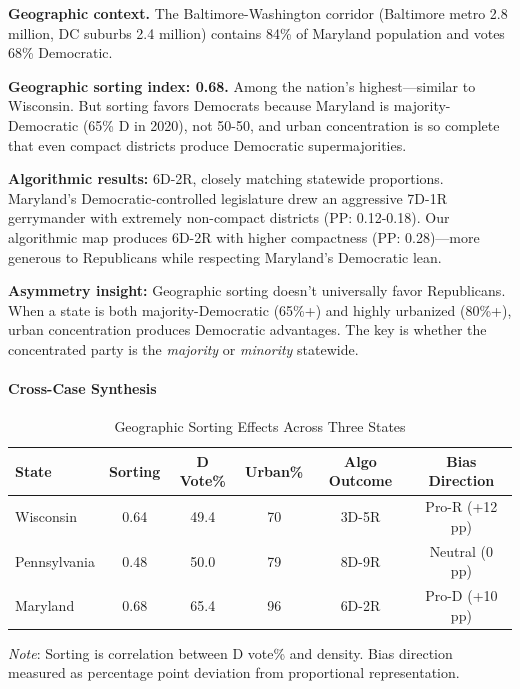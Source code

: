 \textbf{Geographic context.} The Baltimore-Washington corridor (Baltimore metro 2.8 million, DC suburbs 2.4 million) contains 84\% of Maryland population and votes 68\% Democratic.

\textbf{Geographic sorting index: 0.68.} Among the nation's highest---similar to Wisconsin. But sorting favors Democrats because Maryland is majority-Democratic (65\% D in 2020), not 50-50, and urban concentration is so complete that even compact districts produce Democratic supermajorities.

\textbf{Algorithmic results:} 6D-2R, closely matching statewide proportions. Maryland's Democratic-controlled legislature drew an aggressive 7D-1R gerrymander with extremely non-compact districts (PP: 0.12-0.18). Our algorithmic map produces 6D-2R with higher compactness (PP: 0.28)---more generous to Republicans while respecting Maryland's Democratic lean.

\textbf{Asymmetry insight:} Geographic sorting doesn't universally favor Republicans. When a state is both majority-Democratic (65\%+) and highly urbanized (80\%+), urban concentration produces Democratic advantages. The key is whether the concentrated party is the \textit{majority} or \textit{minority} statewide.

\paragraph{Cross-Case Synthesis}

\begin{table}[ht]
\centering
\caption{Geographic Sorting Effects Across Three States}
\label{tab:case_study_comparison}
\small
\begin{tabular}{lccccc}
\toprule
State & Sorting & D Vote\% & Urban\% & Algo Outcome & Bias Direction \\
\midrule
Wisconsin & 0.64 & 49.4 & 70 & 3D-5R & Pro-R (+12 pp) \\
Pennsylvania & 0.48 & 50.0 & 79 & 8D-9R & Neutral (0 pp) \\
Maryland & 0.68 & 65.4 & 96 & 6D-2R & Pro-D (+10 pp) \\
\bottomrule
\end{tabular}
\begin{tablenotes}
\small
\item \textit{Note}: Sorting is correlation between D vote\% and density. Bias direction measured as percentage point deviation from proportional representation.
\end{tablenotes}
\end{table}

